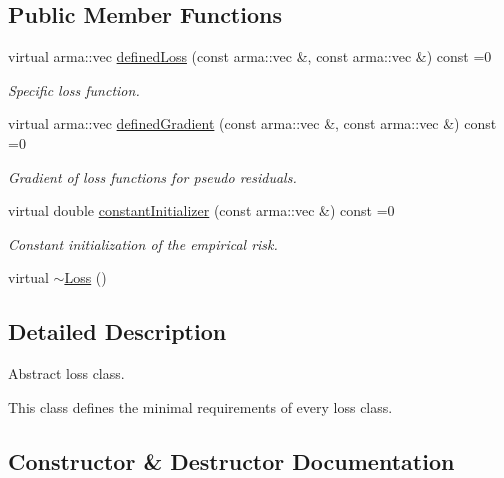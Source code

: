\subsection*{Public Member Functions}
\begin{DoxyCompactItemize}
\item 
virtual arma\+::vec \mbox{\hyperlink{classloss_1_1_loss_ae9f94dd9b8311397583ba3a9cb485e94}{defined\+Loss}} (const arma\+::vec \&, const arma\+::vec \&) const =0
\begin{DoxyCompactList}\small\item\em Specific loss function. \end{DoxyCompactList}\item 
virtual arma\+::vec \mbox{\hyperlink{classloss_1_1_loss_a267a4de70747ade4b2d84ce35a448979}{defined\+Gradient}} (const arma\+::vec \&, const arma\+::vec \&) const =0
\begin{DoxyCompactList}\small\item\em Gradient of loss functions for pseudo residuals. \end{DoxyCompactList}\item 
virtual double \mbox{\hyperlink{classloss_1_1_loss_a65fe7dcd9370e6a549b8d1cc95fc8798}{constant\+Initializer}} (const arma\+::vec \&) const =0
\begin{DoxyCompactList}\small\item\em Constant initialization of the empirical risk. \end{DoxyCompactList}\item 
virtual \mbox{\hyperlink{classloss_1_1_loss_a868a7908fd97590b6c4fc69f4eb3c570}{$\sim$\+Loss}} ()
\end{DoxyCompactItemize}


\subsection{Detailed Description}
Abstract loss class. 

This class defines the minimal requirements of every loss class. 

\subsection{Constructor \& Destructor Documentation}
\mbox{\label{classloss_1_1_loss_a868a7908fd97590b6c4fc69f4eb3c570}} 

